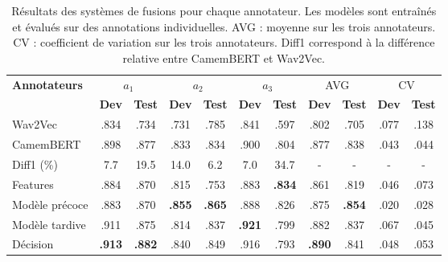 \begin{table}[h]
    \centering
    \begin{tabular}{| l |cc| cc | cc | cc | cc |}\hline
     \textbf{Annotateurs} & \multicolumn{2}{c|}{$a_1$} & \multicolumn{2}{c|}{$a_2$}  &\multicolumn{2}{c|}{$a_3$} &\multicolumn{2}{c|}{AVG} & \multicolumn{2}{c|}{CV}\\
      & \textbf{Dev} &\textbf{Test} &\textbf{Dev}  &\textbf{Test} & \textbf{Dev} &\textbf{Test} & \textbf{Dev} &\textbf{Test} & \textbf{Dev} &\textbf{Test}\\ \hline

     Wav2Vec    & .834 & .734 & .731 & .785 & .841 & .597 & .802 & .705 & .077 & .138\\
     CamemBERT  & .898 & .877 & .833 & .834 & .900 & .804 & .877 & .838 & .043 & .044\\
     Diff1 (\%)           & 7.7 & 19.5 & 14.0 & 6.2 & 7.0 & 34.7 & - & - & - & -\\
     \hline
     Features              & .884 & .870 & .815 & .753 & .883 & \textbf{.834} & .861 & .819 & .046 & .073 \\
     \hline
     Modèle précoce    & .883 & .870 & \textbf{.855} & \textbf{.865} & .888 & .826 & .875 & \textbf{.854} & .020 & .028\\
     Modèle tardive     & .911 & .875 & .814 & .837 & \textbf{.921} & .799 & .882 & .837 & .067 & .045\\
     \hline
     Décision           & \textbf{.913} & \textbf{.882} & .840 & .849 & .916 & .793 & \textbf{.890} & .841 & .048 & .053 \\
     \hline

    \end{tabular}
    \caption{Résultats des systèmes de fusions pour chaque annotateur. Les modèles sont entraînés et évalués sur des annotations individuelles. AVG : moyenne sur les trois annotateurs. CV : coefficient de variation sur les trois annotateurs. Diff1 correspond à la différence relative entre CamemBERT et Wav2Vec.}
    \label{tab:ind_by_annotator}
\end{table}
